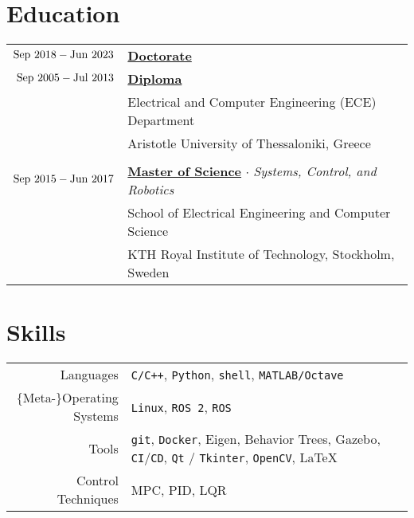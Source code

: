 \documentclass[a4paper,10pt,twoside]{article}
\begin{document}

\section{Education}

\begin{tabular}{rp{12cm}}
$\textnormal{Sep } 2018 - \textnormal{Jun } 2023$ & \href{https://ikee.lib.auth.gr/record/354644}{\textbf{Doctorate}} \\
$\textnormal{Sep } 2005 - \textnormal{Jul } 2013$ & \href{https://ikee.lib.auth.gr/record/291560}{\textbf{Diploma}} \\
                                                 & Electrical and Computer Engineering (ECE) Department\\
                                                 & Aristotle University of Thessaloniki, Greece \\\vspace{-7pt}
&\\
$\textnormal{Sep }2015 - \textnormal{Jun }2017$ & \href{http://kth.diva-portal.org/smash/record.jsf?pid=diva2\%3A1102597\&dswid=2875}{\textbf{Master of Science}} $\cdot$ \textit{Systems, Control, and Robotics}\\
                                                & School of Electrical Engineering and Computer Science\\
                                                & KTH Royal Institute of Technology, Stockholm, Sweden\\
\end{tabular}\vspace{7pt}

\section{Skills}

\begin{tabular}{rp{12cm}}
Languages & \texttt{C/C++}, \texttt{Python}, \texttt{shell}, \texttt{MATLAB/Octave} \\
$\{$Meta-$\}$Operating Systems & \texttt{Linux}, \texttt{ROS 2}, \texttt{ROS} \\
  Tools & \texttt{git}, \texttt{Docker}, Eigen, Behavior Trees, Gazebo, \texttt{CI}/\texttt{CD}, \texttt{Qt} / \texttt{Tkinter}, \texttt{OpenCV}, \LaTeX \\
Control Techniques & MPC, PID, LQR \\
\end{tabular}
\end{document}
